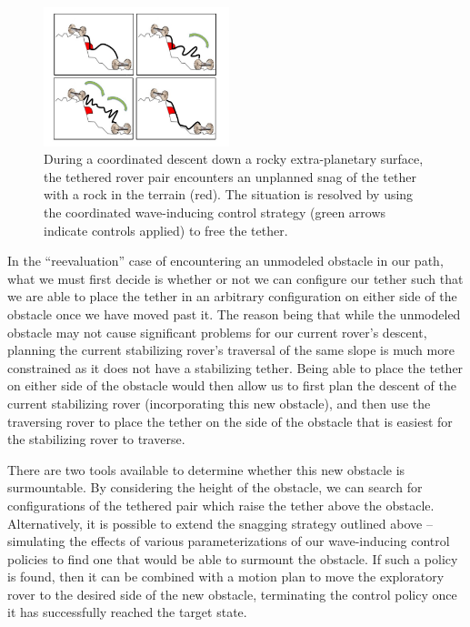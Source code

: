 \documentclass[12pt]{article}
\begin{document}
\begin{figure}
  \begin{center}
    \vspace{-0.6in}
    \includegraphics[width=0.48\textwidth, right]{tether_desnag.jpg}
  \end{center}
  \vspace{-0.4in}
  \caption{During a coordinated descent down a rocky extra-planetary
    surface, the tethered rover pair encounters an unplanned snag of
    the tether with a rock in the terrain (red). The situation is
    resolved by using the coordinated wave-inducing control strategy
    (green arrows indicate controls applied) to free the tether.}
  \label{fig:tethersnag}
  \vspace{-0.2in}
\end{figure}


In the ``reevaluation'' case of encountering an unmodeled obstacle in our
path, what we must first decide is whether or not we can configure our
tether such that we are able to place the tether in an arbitrary
configuration on either side of the obstacle once we have moved past
it. The reason being that
while the unmodeled obstacle may not cause significant problems for
our current rover's descent, planning the current stabilizing rover's
traversal of the same slope is much more constrained as it does not
have a stabilizing tether. Being able to place the tether on either
side of the obstacle would then allow us to first plan the descent of
the current stabilizing rover (incorporating this new obstacle), and
then use the traversing rover to place the tether on the side of the
obstacle that is easiest for the stabilizing rover to traverse.

There are two tools available to determine whether this new obstacle
is surmountable. By considering the height of the obstacle, we can
search for configurations of the tethered pair which raise the tether
above the obstacle.  Alternatively, it is possible to extend the
snagging strategy outlined above -- simulating the effects of various
parameterizations of our wave-inducing control policies to find one
that would be able to surmount the obstacle. If such a policy is
found, then it can be combined with a motion plan to move the
exploratory rover to the desired side of the new obstacle, terminating
the control policy once it has successfully reached the target state.
\end{document}

